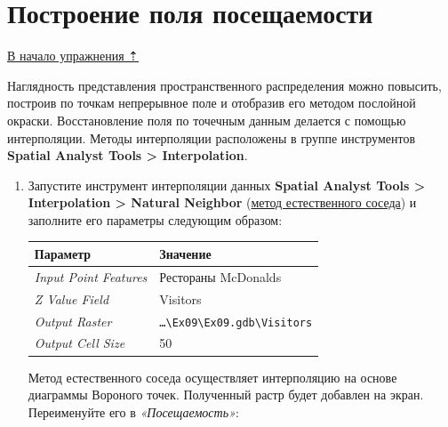 \documentclass[]{book}
\theoremstyle{definition}
\theoremstyle{definition}
\theoremstyle{definition}
\theoremstyle{remark}
\begin{document}
\hypertarget{geocoding-field}{%
\section{Построение поля посещаемости}\label{geocoding-field}}

\protect\hyperlink{geocoding}{В начало упражнения ⇡}

Наглядность представления пространственного распределения можно
повысить, построив по точкам непрерывное поле и отобразив его методом
послойной окраски. Восстановление поля по точечным данным делается с
помощью интерполяции. Методы интерполяции расположены в группе
инструментов \textbf{Spatial Analyst Tools \textgreater{}
Interpolation}.

\begin{enumerate}
\def\labelenumi{\arabic{enumi}.}
\item
  Запустите инструмент интерполяции данных \textbf{Spatial Analyst Tools
  \textgreater{} Interpolation \textgreater{} Natural Neighbor}
  (\href{http://desktop.arcgis.com/ru/arcmap/10.3/tools/spatial-analyst-toolbox/natural-neighbor.htm}{метод
  естественного соседа}) и заполните его параметры следующим образом:

  \begin{longtable}[]{@{}ll@{}}
  \toprule
  Параметр & Значение\tabularnewline
  \midrule
  \endhead
  \emph{Input Point Features} & Рестораны McDonalds\tabularnewline
  \emph{Z Value Field} & Visitors\tabularnewline
  \emph{Output Raster} &
  \texttt{\ldots{}\textbackslash{}Ex09\textbackslash{}Ex09.gdb\textbackslash{}Visitors}\tabularnewline
  \emph{Output Cell Size} & 50\tabularnewline
  \bottomrule
  \end{longtable}

  Метод естественного соседа осуществляет интерполяцию на основе
  диаграммы Вороного точек. Полученный растр будет добавлен на экран.
  Переименуйте его в \emph{«Посещаемость»}:


\end{enumerate}
\end{document}

